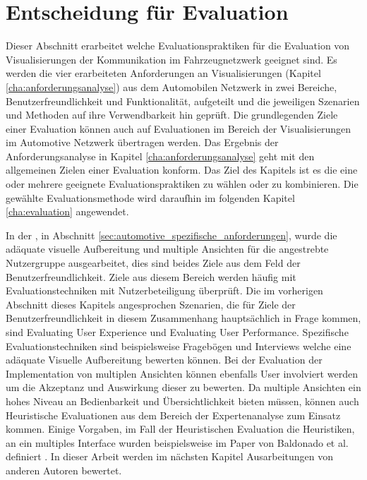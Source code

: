 \documentclass[draft=false
              ,paper=a4
              ,twoside=false
              ,fontsize=11pt
              ,headsepline
              ,BCOR10mm
              ,DIV11
              ]{scrbook}
\begin{document}
\section{Entscheidung für Evaluation} %
\label{sec:entscheidung_für_Evaluation}
Dieser Abschnitt erarbeitet welche Evaluationspraktiken für die Evaluation von Visualisierungen der Kommunikation im Fahrzeugnetzwerk geeignet sind. Es werden die vier erarbeiteten Anforderungen an Visualisierungen (Kapitel \ref{cha:anforderungsanalyse}) aus dem Automobilen Netzwerk in zwei Bereiche, Benutzerfreundlichkeit und Funktionalität, aufgeteilt und die jeweiligen Szenarien und Methoden auf ihre Verwendbarkeit hin geprüft. Die grundlegenden Ziele einer Evaluation können auch auf Evaluationen im Bereich der Visualisierungen im Automotive Netzwerk übertragen werden. Das Ergebnis der Anforderungsanalyse in Kapitel \ref{cha:anforderungsanalyse} geht mit den allgemeinen Zielen einer Evaluation konform. Das Ziel des Kapitels ist es die eine oder mehrere geeignete Evaluationspraktiken zu wählen oder zu kombinieren. Die gewählte Evaluationsmethode wird daraufhin im folgenden Kapitel \ref{cha:evaluation} angewendet.  

In der , in Abschnitt \ref{sec:automotive_spezifische_anforderungen}, wurde die adäquate visuelle Aufbereitung und multiple Ansichten für die angestrebte Nutzergruppe ausgearbeitet, dies sind beides Ziele aus dem Feld der Benutzerfreundlichkeit. Ziele aus diesem Bereich werden häufig mit Evaluationstechniken mit Nutzerbeteiligung überprüft. Die im vorherigen Abschnitt dieses Kapitels angesprochen Szenarien, die für Ziele der Benutzerfreundlichkeit in diesem Zusammenhang hauptsächlich in Frage kommen, sind Evaluating User Experience und Evaluating User Performance. Spezifische Evaluationstechniken sind beispielsweise Fragebögen und Interviews welche eine adäquate Visuelle Aufbereitung bewerten können. Bei der Evaluation der Implementation von multiplen Ansichten können ebenfalls User involviert werden um die Akzeptanz und Auswirkung dieser zu bewerten. Da multiple Ansichten ein hohes Niveau an Bedienbarkeit und Übersichtlichkeit bieten müssen, können auch Heuristische Evaluationen aus dem Bereich der Expertenanalyse zum Einsatz kommen. Einige Vorgaben, im Fall der Heuristischen Evaluation die Heuristiken, an ein multiples Interface wurden beispielsweise im Paper von Baldonado et al. definiert \cite{wang_baldonado_guidelines_2000}. In dieser Arbeit werden im nächsten Kapitel Ausarbeitungen von anderen Autoren bewertet.
\end{document}
